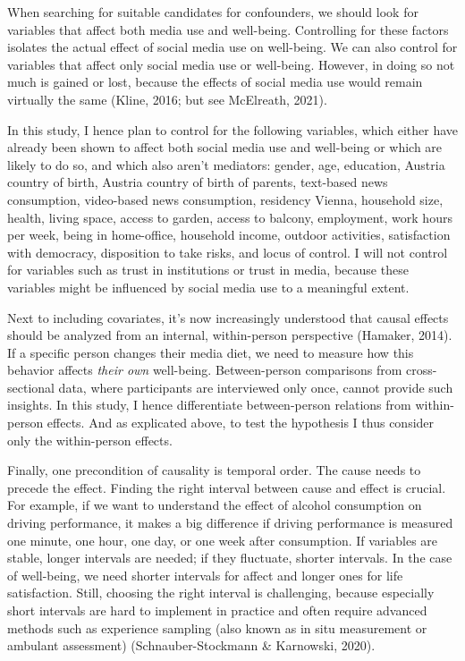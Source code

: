 \documentclass[
  english,
  man,floatsintext]{apa6}
\begin{document}
When searching for suitable candidates for confounders, we should look for variables that affect both media use and well-being.
Controlling for these factors isolates the actual effect of social media use on well-being.
We can also control for variables that affect only social media use or well-being.
However, in doing so not much is gained or lost, because the effects of social media use would remain virtually the same (Kline, 2016; but see McElreath, 2021).

In this study, I hence plan to control for the following variables, which either have already been shown to affect both social media use and well-being or which are likely to do so, and which also aren't mediators:
gender, age, education, Austria country of birth, Austria country of birth of parents, text-based news consumption, video-based news consumption, residency Vienna, household size, health, living space, access to garden, access to balcony, employment, work hours per week, being in home-office, household income, outdoor activities, satisfaction with democracy, disposition to take risks, and locus of control.
I will not control for variables such as trust in institutions or trust in media, because these variables might be influenced by social media use to a meaningful extent.

Next to including covariates, it's now increasingly understood that causal effects should be analyzed from an internal, within-person perspective (Hamaker, 2014).
If a specific person changes their media diet, we need to measure how this behavior affects \emph{their own} well-being.
Between-person comparisons from cross-sectional data, where participants are interviewed only once, cannot provide such insights.
In this study, I hence differentiate between-person relations from within-person effects.
And as explicated above, to test the hypothesis I thus consider only the within-person effects.

Finally, one precondition of causality is temporal order.
The cause needs to precede the effect.
Finding the right interval between cause and effect is crucial.
For example, if we want to understand the effect of alcohol consumption on driving performance, it makes a big difference if driving performance is measured one minute, one hour, one day, or one week after consumption.
If variables are stable, longer intervals are needed; if they fluctuate, shorter intervals.
In the case of well-being, we need shorter intervals for affect and longer ones for life satisfaction.
Still, choosing the right interval is challenging, because especially short intervals are hard to implement in practice and often require advanced methods such as experience sampling (also known as in situ measurement or ambulant assessment) (Schnauber-Stockmann \& Karnowski, 2020).
\end{document}
